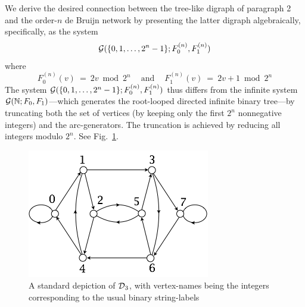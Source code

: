 We derive the desired connection between the tree-like digraph of paragraph 2 and the order-$n$
de Bruijn network by presenting the latter digraph algebraically, specifically, as the system 
\[ \mbox{$\cal G$}(\{0, 1, \ldots, 2^n-1\}; F^{(n)}_0, F^{(n)}_1) \]
where
\[ F^{(n)}_0(v) \ = \ 2v \bmod 2^n \ \ \ \ \mbox{ and } \ \ \ \ F^{(n)}_1(v) \ = \ 2v +1 \bmod 2^n \]
The system $\mbox{$\cal G$}(\{0, 1, \ldots, 2^n-1\}; F^{(n)}_0, F^{(n)}_1)$ thus differs from the infinite system 
$\mbox{$\cal G$}(\mathbb{N}; F_0, F_1)$---which generates the root-looped directed infinite binary tree---by truncating
both the set of vertices (by keeping only the first $2^n$ nonnegative integers) and the arc-generators.  The truncation is achieved by reducing all integers modulo $2^n$.  See Fig.~\ref{fig:deBruijn}.
\begin{figure}[hbt]
\begin{center}
       \includegraphics[scale=0.5]{FiguresGraph/dB2by3numbers}
       \caption{A standard depiction of $\mbox{$\cal D$}_3$, with vertex-names being the integers corresponding to the usual binary string-labels}
  \label{fig:deBruijn}
\end{center}
\end{figure}

\smallskip

